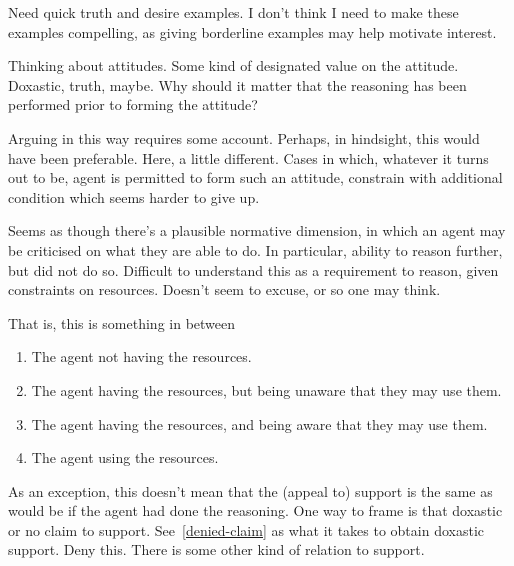 \begin{note}

\end{note}

\begin{note}[Examples]
  Need quick truth and desire examples.
  I don't think I need to make these examples compelling, as giving borderline examples may help motivate interest.
\end{note}

\begin{note}
  Thinking about attitudes.
  Some kind of designated value on the attitude.
  Doxastic, truth, maybe.
  Why should it matter that the reasoning has been performed prior to forming the attitude?

  Arguing in this way requires some account.
  Perhaps, in hindsight, this would have been preferable.
  Here, a little different.
  Cases in which, whatever it turns out to be, agent is permitted to form such an attitude, constrain with additional condition which seems harder to give up.
\end{note}

\begin{note}
  Seems as though there's a plausible normative dimension, in which an agent may be criticised on what they are able to do.
  In particular, ability to reason further, but did not do so.
  Difficult to understand this as a requirement to reason, given constraints on resources.
  Doesn't seem to excuse, or so one may think.

  That is, this is something in between
  \begin{enumerate}
  \item The agent not having the resources.
  \item The agent having the resources, but being unaware that they may use them.
  \item The agent having the resources, and being aware that they may use them.
  \item The agent using the resources.
  \end{enumerate}
\end{note}

\begin{note}
  As an exception, this doesn't mean that the (appeal to) support is the same as would be if the agent had done the reasoning.
  One way to frame is that doxastic or no claim to support.
  See~\ref{denied-claim} as what it takes to obtain doxastic support.
  Deny this.
  There is some other kind of relation to support.
\end{note}

